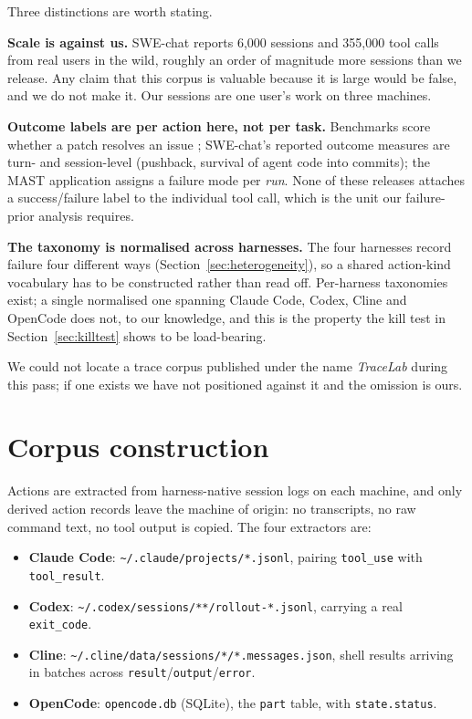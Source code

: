 \documentclass[11pt]{article}
\begin{document}
Three distinctions are worth stating.

\textbf{Scale is against us.} SWE-chat reports 6{,}000 sessions and 355{,}000
tool calls from real users in the wild, roughly an order of magnitude more
sessions than we release. Any claim that this corpus is valuable because it is
large would be false, and we do not make it. Our sessions are one user's work
on three machines.

\textbf{Outcome labels are per action here, not per task.} Benchmarks score
whether a patch resolves an issue \cite{jimenez2024swebench}; SWE-chat's
reported outcome measures are turn- and session-level (pushback, survival of
agent code into commits); the MAST application assigns a failure mode per
\emph{run}. None of these releases attaches a success/failure label to the
individual tool call, which is the unit our failure-prior analysis requires.

\textbf{The taxonomy is normalised across harnesses.} The four harnesses record
failure four different ways (Section~\ref{sec:heterogeneity}), so a shared
action-kind vocabulary has to be constructed rather than read off. Per-harness
taxonomies exist; a single normalised one spanning Claude Code, Codex, Cline
and OpenCode does not, to our knowledge, and this is the property the kill test
in Section~\ref{sec:killtest} shows to be load-bearing.

We could not locate a trace corpus published under the name \emph{TraceLab}
during this pass; if one exists we have not positioned against it and the
omission is ours.

\section{Corpus construction}

Actions are extracted from harness-native session logs on each machine,
and only derived action records leave the machine of origin: no
transcripts, no raw command text, no tool output is copied. The four
extractors are:

\begin{itemize}
\item \textbf{Claude Code}: \texttt{\textasciitilde/.claude/projects/*.jsonl},
  pairing \texttt{tool\_use} with \texttt{tool\_result}.
\item \textbf{Codex}: \texttt{\textasciitilde/.codex/sessions/**/rollout-*.jsonl},
  carrying a real \texttt{exit\_code}.
\item \textbf{Cline}:
  \texttt{\textasciitilde/.cline/data/sessions/*/*.messages.json}, shell
  results arriving in batches across \texttt{result}/\texttt{output}/\texttt{error}.
\item \textbf{OpenCode}: \texttt{opencode.db} (SQLite), the \texttt{part}
  table, with \texttt{state.status}.
\end{itemize}
\end{document}
